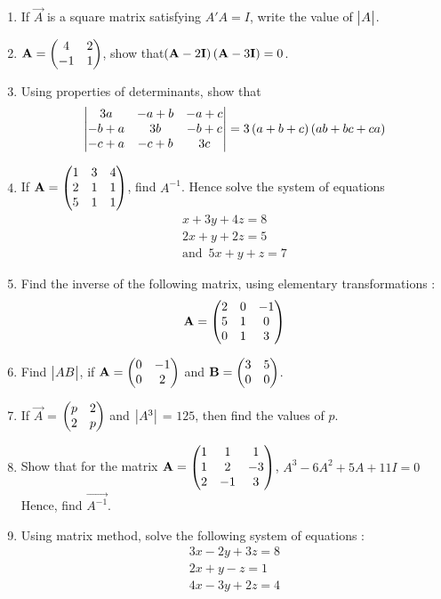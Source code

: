 \begin{enumerate}
\item If $\vec{A}$ is a square matrix satisfying $A'A = I$, write the value of $\begin{vmatrix}A\end{vmatrix}$.

\item $\mathbf{A}= \begin{pmatrix}4&2\\-1& 1\end{pmatrix}$, show that$\left(\mathbf{A}-2\mathbf{I}\right)\left(\mathbf{A}-3\mathbf{I}\right)= 0$.

\item Using properties of determinants, show that 
\begin{align*}
\begin{vmatrix}3a & -a+b & -a+c \\ -b+a & 3b & -b+c \\ -c+a & -c+b & 3c\end{vmatrix} = 3\left(a+b+c\right)\left(ab+bc+ca\right)
\end{align*}

\item If ${\mathbf{A}} = \begin{pmatrix}1&3&4\\2&1&1\\5&1&1\end{pmatrix}$, find $A^{-1}$.
        Hence solve the system of equations 
            \begin{align*}
                {x+3y+4z}=8 \\
                {2x+y+2z}=5 \\
            \text{and}\hspace{6pt} {5x+y+z} =7
            \end{align*}    
         
  \item Find the inverse of the following matrix, using elementary transformations :
                \begin{align*}
                {\mathbf{A}} = \begin{pmatrix}2&0&-1\\5&1&0\\ 0&1&3\end{pmatrix}
                \end{align*}
                
\item Find $\begin{vmatrix}AB\end{vmatrix}$, if $\mathbf{A}=\begin{pmatrix}0&-1 \\ 0&2\end{pmatrix}$ and $\mathbf{B}=\begin{pmatrix}3&5 \\ 0&0\end{pmatrix}$.

\item If $\vec{A}$ = $\begin{pmatrix}p&2 \\ 2&p\end{pmatrix}$ and $\begin{vmatrix}A^3\end{vmatrix}$ = $125$, then find the values of $p$.

\item Show that for the matrix $\mathbf{A}=\begin{pmatrix}1&1&1 \\ 1&2&-3 \\ 2&-1&3\end{pmatrix}$, ${A}^3-6{A}^2+5{A}+11{I}=0$
Hence, find $\vec{A^{-1}}$.

\item Using matrix method, solve the following system of equations :
\begin{align*}
    {3x-2y+3z}=8 \\
    {2x+y-z}=1 \\
    {4x-3y+2z}=4
\end{align*}
\end{enumerate}
